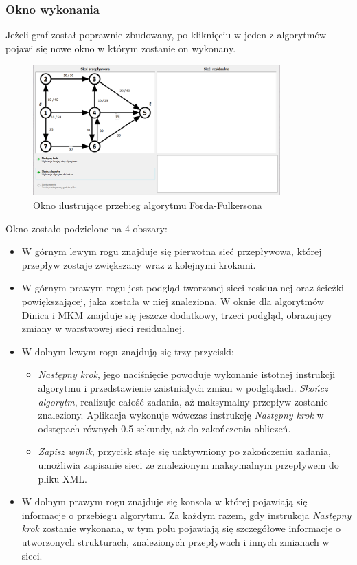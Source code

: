 \subsubsection{Okno wykonania}
Jeżeli graf został poprawnie zbudowany, po kliknięciu w jeden z algorytmów pojawi się nowe okno w którym zostanie on wykonany.
\begin{figure}[H]
	\centering
	\includegraphics[width=0.85\textwidth]{./img/spec_zew06_1}
	\caption{Okno ilustrujące przebieg algorytmu Forda-Fulkersona}
	\label{fig:algorithmWindowStart}
\end{figure}\noindent
Okno zostało podzielone na 4 obszary:
\begin{itemize}
	\item W górnym lewym rogu znajduje się pierwotna sieć przepływowa, której przepływ zostaje zwiększany wraz z kolejnymi krokami.
	\item W górnym prawym rogu jest podgląd tworzonej sieci residualnej oraz ścieżki powiększającej, jaka została w niej znaleziona. W oknie dla algorytmów Dinica i MKM znajduje się jeszcze dodatkowy, trzeci podgląd, obrazujący zmiany w warstwowej sieci residualnej.
	\item W dolnym lewym rogu znajdują się trzy przyciski:
	\begin{itemize}
		\item \textit{Następny krok}, jego naciśnięcie powoduje wykonanie istotnej instrukcji algorytmu i przedstawienie zaistniałych zmian w podglądach.
		\textit{Skończ algorytm}, realizuje całość zadania, aż maksymalny przepływ zostanie znaleziony. Aplikacja wykonuje wówczas instrukcję \textit{Następny krok} w odstępach równych 0.5 sekundy, aż do zakończenia obliczeń.
		\item \textit{Zapisz wynik}, przycisk staje się uaktywniony po zakończeniu zadania, umożliwia zapisanie sieci ze znalezionym maksymalnym przepływem do pliku XML.
	\end{itemize}
	\item W dolnym prawym rogu znajduje się konsola w której pojawiają się informacje o przebiegu algorytmu. Za każdym razem, gdy instrukcja \textit{Następny krok} zostanie wykonana, w tym polu pojawiają się szczegółowe informacje o utworzonych strukturach, znalezionych przepływach i innych zmianach w sieci.
\end{itemize}
